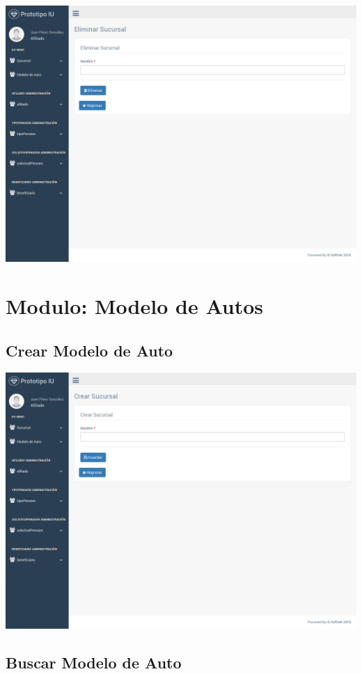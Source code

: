 \documentclass[10pt, letterpaper]{report}
\begin{document}
\includegraphics[width=\linewidth]{ui-prototype/SucursalServices/EliminarSucursalPage.png}


\section{Modulo: Modelo de Autos}

\subsection{Crear Modelo de Auto}

\includegraphics[width=\linewidth]{ui-prototype/SucursalServices/CrearSucursalPage.png}

\subsection{Buscar Modelo de Auto}
\end{document}
